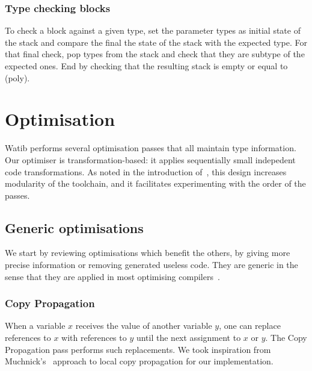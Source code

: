 \documentclass[a4paper,11pt]{article}
\begin{document}
\subsubsection{Type checking blocks}
To check a block against a given type, set the parameter types as initial state
of the stack and compare the final the state of the stack with the expected
type. For that final check, pop types from the stack and check that they
are subtype of the expected ones. End by checking that the resulting stack is
empty or equal to \textsf{(poly)}.

\section{Optimisation}\label{opt}
\textsf{Watib} performs several optimisation passes that all maintain type
information. Our optimiser is transformation-based: it applies sequentially
small indepedent code transformations. As noted in the introduction
of~\cite{jones1998transformation}, this design increases modularity of the
toolchain, and it facilitates experimenting with the order of the passes.


\subsection{Generic optimisations}
We start by reviewing optimisations which benefit the others, by giving more
precise information or removing generated useless code. They are generic in the
sense that they are applied in most optimising
compilers~\cite{muchnick1997advanced}.

\subsubsection{Copy Propagation}
When a variable $x$ receives the value of another variable $y$, one can replace
references to $x$ with references to $y$ until the next assignment to $x$ or
$y$. The Copy Propagation pass performs such replacements. We took inspiration
from Muchnick's~\cite[Section~12.5]{muchnick1997advanced} approach to local copy
propagation for our implementation.
\end{document}
